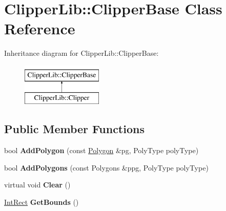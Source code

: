 \hypertarget{classClipperLib_1_1ClipperBase}{\section{Clipper\-Lib\-:\-:Clipper\-Base Class Reference}
\label{classClipperLib_1_1ClipperBase}
}
Inheritance diagram for Clipper\-Lib\-:\-:Clipper\-Base\-:\begin{figure}[H]
\begin{center}
\leavevmode
\includegraphics[height=2.000000cm]{classClipperLib_1_1ClipperBase}
\end{center}
\end{figure}
\subsection*{Public Member Functions}
\begin{DoxyCompactItemize}
\item 
\hypertarget{classClipperLib_1_1ClipperBase_a62f7b073052eed2d0ee9af69a237badd}{bool {\bfseries Add\-Polygon} (const \hyperlink{classPolygon}{Polygon} \&pg, Poly\-Type poly\-Type)}\label{classClipperLib_1_1ClipperBase_a62f7b073052eed2d0ee9af69a237badd}

\item 
\hypertarget{classClipperLib_1_1ClipperBase_a5cdf386f8ba72b196dec6ad0a8607bbf}{bool {\bfseries Add\-Polygons} (const Polygons \&ppg, Poly\-Type poly\-Type)}\label{classClipperLib_1_1ClipperBase_a5cdf386f8ba72b196dec6ad0a8607bbf}

\item 
\hypertarget{classClipperLib_1_1ClipperBase_a5690952fe8c2cb047025566405827821}{virtual void {\bfseries Clear} ()}\label{classClipperLib_1_1ClipperBase_a5690952fe8c2cb047025566405827821}

\item 
\hypertarget{classClipperLib_1_1ClipperBase_a5590a5454248ac3f6beeba7f9690f62e}{\hyperlink{structClipperLib_1_1IntRect}{Int\-Rect} {\bfseries Get\-Bounds} ()}\label{classClipperLib_1_1ClipperBase_a5590a5454248ac3f6beeba7f9690f62e}

\end{DoxyCompactItemize}
